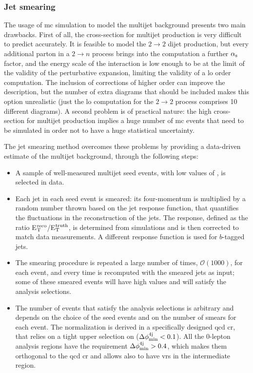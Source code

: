 \subsubsection*{Jet smearing}
\label{sec:jet_smearing}

The usage of \gls{mc} simulation to model the multijet background presents two main drawbacks.
First of all, the cross-section for multijet production is very difficult to predict accurately. 
It is feasible to model the $2 \to 2$ dijet production, 
but every additional parton in a $2 \to n$ process brings into the computation a further $\alpha_{\rm{s}}$ factor, 
and the energy scale of the interaction is low enough to be at the limit of the validity of the perturbative expansion, limiting the validity of a  \gls{lo} order computation. The inclusion of corrections of higher order can improve the description, but the number of extra diagrams that should be included makes this option unrealistic (just the \gls{lo} computation for the $2 \to 2$ process comprises 10 different diagrams).
A second problem is of practical nature: the high cross-section for multijet production implies a huge number of \gls{mc} events that need to be simulated in order not to have a huge statistical uncertainty. 

The jet smearing method overcomes these problems by providing a data-driven estimate of the multijet background, through the following steps:
\begin{itemize}
\item A sample of well-measured multijet seed events, with low values of \met, is selected in data.

\item Each jet in each seed event is smeared: its four-momentum is multiplied by a random number thrown based on the jet response function, that quantifies the fluctuations in the \pt reconstruction of the jets. The response, defined as the ratio E$_{\rm{T}}^{\rm{reco}}$/E$_{\rm{T}}^{\rm{truth}}$, is determined from simulations and is then corrected to match data measurements. 
A different response function is used for $b$-tagged jets. 

\item The smearing procedure is repeated a large number of times, $\mathcal{O}(1000)$, for each event, and every time \met is recomputed with the smeared jets as input; some of these smeared events will have high \met values and will satisfy the analysis selections.

\item The number of events that satisfy the analysis selections is arbitrary and depends on the choice of the seed events and on the number of smears for each event. The normalization is derived in a specifically designed \gls{qcd} \gls{cr}, that relies on a tight upper selection on \dphimin ($\Delta\phi_{\rm{min}}^{4{\rm{j}}} < 0.1$). All the 0-lepton analysis regions have the requirement $\Delta\phi_{\rm{min}}^{4{\rm{j}}} > 0.4$, which makes them orthogonal to the \gls{qcd} \gls{cr} and allows also to have \glspl{vr} in the intermediate region. 
\end{itemize}

